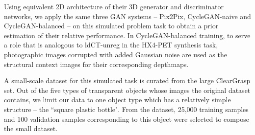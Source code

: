 Using equivalent 2D architecture of their 3D generator and discriminator networks, we apply the same three GAN systems -- Pix2Pix, CycleGAN-naive and CycleGAN-balanced -- on this simulated problem task to obtain a prior estimation of their relative performance. In CycleGAN-balanced training, to serve a role that is analogous to ldCT-unreg in the HX4-PET synthesis task, photographic images corrupted with added Gaussian noise are used as the structural context images for their corresponding depthmaps.

A small-scale dataset for this simulated task is curated from the large ClearGrasp set. Out of the five types of transparent objects whose images the original dataset contains, we limit our data to one object type which has a relatively simple structure -- the ``square plastic bottle". From the dataset, 25,000 training samples and 100 validation samples corresponding to this object were selected to compose the small dataset. 